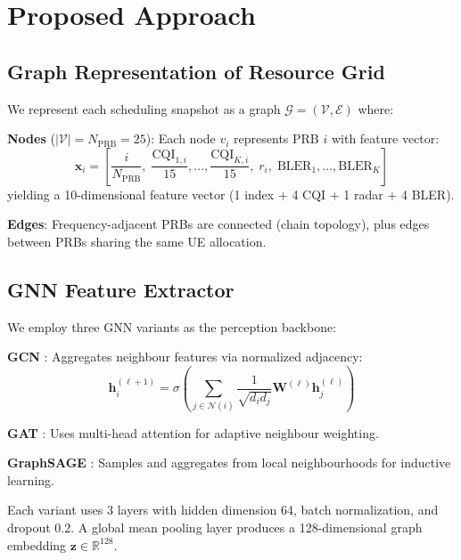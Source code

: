 \documentclass[conference]{IEEEtran}
\begin{document}
\section{Proposed Approach}

\subsection{Graph Representation of Resource Grid}

We represent each scheduling snapshot as a graph $\mathcal{G} = (\mathcal{V}, \mathcal{E})$ where:

\textbf{Nodes} ($|\mathcal{V}| = N_{\text{PRB}} = 25$): Each node $v_i$ represents PRB $i$ with feature vector:
\begin{equation}
    \mathbf{x}_i = \left[\frac{i}{N_{\text{PRB}}},\; \frac{\text{CQI}_{1,i}}{15}, \ldots, \frac{\text{CQI}_{K,i}}{15},\; r_i,\; \text{BLER}_1, \ldots, \text{BLER}_K\right]
\end{equation}
yielding a 10-dimensional feature vector (1 index + 4 CQI + 1 radar + 4 BLER).

\textbf{Edges}: Frequency-adjacent PRBs are connected (chain topology), plus edges between PRBs sharing the same UE allocation.

\subsection{GNN Feature Extractor}

We employ three GNN variants as the perception backbone:

\textbf{GCN} \cite{kipf2017gcn}: Aggregates neighbour features via normalized adjacency:
\begin{equation}
    \mathbf{h}_i^{(\ell+1)} = \sigma\left(\sum_{j \in \mathcal{N}(i)} \frac{1}{\sqrt{d_i d_j}} \mathbf{W}^{(\ell)} \mathbf{h}_j^{(\ell)}\right)
\end{equation}

\textbf{GAT} \cite{velickovic2018gat}: Uses multi-head attention for adaptive neighbour weighting.

\textbf{GraphSAGE} \cite{hamilton2017sage}: Samples and aggregates from local neighbourhoods for inductive learning.

Each variant uses 3 layers with hidden dimension 64, batch normalization, and dropout 0.2. A global mean pooling layer produces a 128-dimensional graph embedding $\mathbf{z} \in \mathbb{R}^{128}$.
\end{document}
